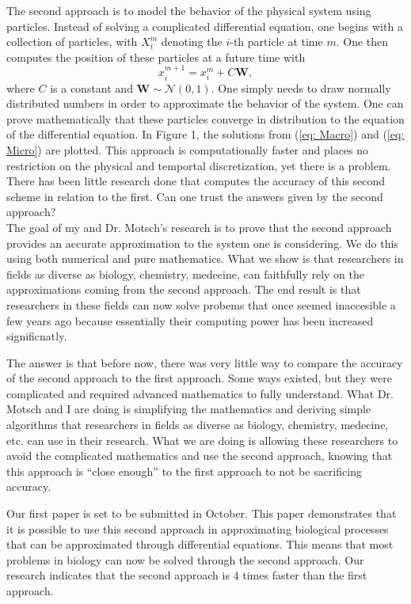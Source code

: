 \documentclass[8 pt]{article}
\begin{document}
\noindent The second approach is to model the behavior of the physical system using particles. Instead of solving a complicated differential equation, one begins with a collection of particles, with $X_i^{m}$ denoting the $i$-th particle at time $m.$ One then computes the position of these particles at a future time with  
\begin{equation}
x_i^{m+1} = x_i^{m} + C\textbf{W},
\label{eq: Micro}
\end{equation}
where $C$ is a constant and $\textbf{W} \sim \mathcal{N}(0, 1).$ One simply needs to draw normally distributed numbers in order to approximate the behavior of the system. One can prove mathematically that these particles converge in distribution to the equation of the differential equation. In Figure 1,
the solutions from (\ref{eq: Macro}) and (\ref{eq: Micro}) are plotted.
This approach is computationally faster and places no restriction on the physical and temportal discretization, yet there is a problem. There has been little research done that computes the accuracy of this second scheme in relation to the first. Can one trust the answers given by the second approach? \\
The goal of my and Dr. Motsch's research is to prove that the second approach provides an accurate approximation to the system one is considering. We do this using both numerical and pure mathematics. What we show is that researchers in fields as diverse as biology, chemistry, medecine, can faithfully rely on the approximations coming from the second approach. The end result is that researchers in these fields can now solve probems that once seemed inaccesible a few years ago because essentially their computing power has been increased significnatly. 

The answer is that before now, there was very little way to compare the accuracy of the second approach to the first approach. Some ways existed, but they were complicated and required advanced mathematics to fully understand. What Dr. Motsch and I are doing is simplifying the mathematics and deriving simple algorithms that researchers in fields as diverse as biology, chemistry, medecine, etc. can use in their research. What we are doing is allowing these researchers to avoid the complicated mathematics and use the second approach, knowing that this approach is ``close enough'' to the first approach to not be sacrificing accuracy. 

Our first paper is set to be submitted in October. This paper demonstrates that it is possible to use this second approach in approximating biological processes that can be approximated through differential equations. This means that most problems in biology can now be solved through the second approach. Our research indicates that the second approach is 4 times faster than the first approach.
\end{document}
